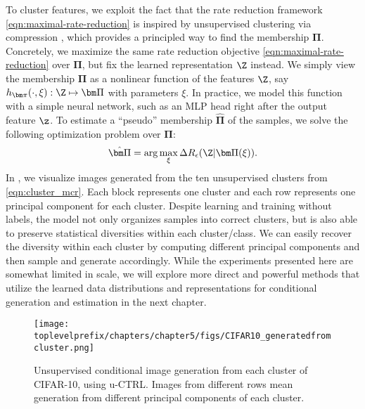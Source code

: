 \documentclass[../../book-main.tex]{subfiles}
\begin{document}
To cluster features, we exploit the fact that the rate reduction framework \eqref{eqn:maximal-rate-reduction} is inspired by unsupervised clustering via compression \cite{ma2007segmentation}, which provides a principled way to find the membership $\bm \Pi$.
Concretely, we maximize the same rate reduction objective \eqref{eqn:maximal-rate-reduction} over $\bm \Pi$, but fix the learned representation $\Z$ instead. We simply view the membership $\bm \Pi$ as a nonlinear function of the features $\Z$, say $h_{\bm \pi}(\cdot,\xi):\Z \mapsto \bm \Pi$ with parameters $\xi$. In practice, we model this function with a simple neural network, such as an MLP head right after the output feature $\z$. 
To estimate a ``pseudo'' membership $\hat{\bm \Pi}$ of the samples, we solve the following optimization problem over $\bm \Pi$:
\begin{align}
    \hat{\bm \Pi} = \arg\max_{\xi} \Delta R_\epsilon(\Z| \bm \Pi(\xi)).
\label{eqn:cluster_mcr}
\end{align}
In , we  visualize images generated from the ten unsupervised clusters from \eqref{eqn:cluster_mcr}. Each block represents one cluster and each row represents one principal component for each cluster. Despite learning and training without labels, the model not only organizes samples into correct clusters, but is also able to preserve statistical diversities within each cluster/class. We can easily recover the diversity within each cluster by computing different principal components and then sample and generate accordingly. While the experiments presented here are somewhat limited in scale, we will explore more direct and powerful methods that utilize the learned data distributions and representations for conditional generation and estimation in the next chapter.
\begin{figure}[t]
    \footnotesize
    \centering
    \texttt{[image: \\toplevelprefix/chapters/chapter5/figs/CIFAR10\_generatedfromcluster.png]}
    \caption{\small Unsupervised conditional image generation from each cluster of CIFAR-10, using u-CTRL. Images from different rows mean generation from different principal components of each cluster.}
    \label{fig:vis_clustering}
\end{figure}
\end{document}
